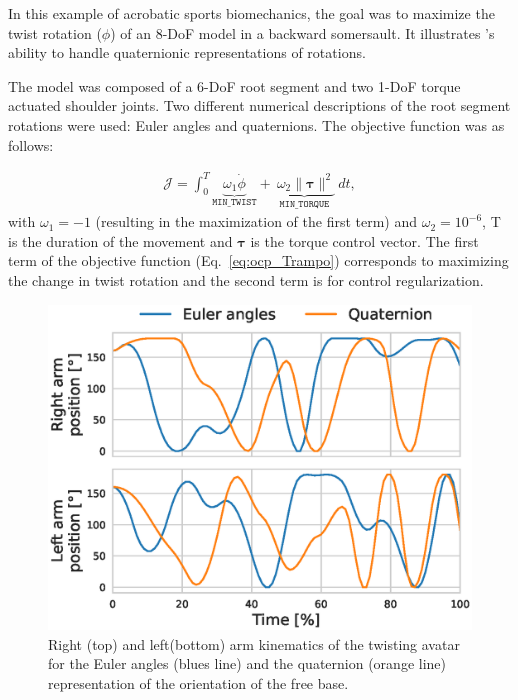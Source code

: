 In this example of acrobatic sports biomechanics, the goal was to maximize the twist rotation ($\phi$) of an 8-DoF model in a backward somersault. 
It illustrates \bioptim 's ability to handle quaternionic representations of rotations.

The model was composed of a 6-DoF root segment and two 1-DoF torque actuated shoulder joints.
Two different numerical descriptions of the root segment rotations were used: Euler angles and quaternions.
The objective function was as follows:

\begin{eqnarray}\label{eq:ocp_Trampo}
\mathcal{J} =  \int_0^T\underbrace{\omega_1 \dot{\phi}}_{\mathtt{MIN\_TWIST}}  + \underbrace{~\omega_2  \|\boldsymbol{\tau}\|^2}_{\mathtt{MIN\_ TORQUE}}~dt,
\end{eqnarray} 
with $\omega_1 = -1$ (resulting in the maximization of the first term) and $\omega_2 = 10^{-6}$, T is the duration of the movement and $\boldsymbol{\tau}$ is the torque control vector.
The first term of the objective function (Eq.~\ref{eq:ocp_Trampo}) corresponds to maximizing the change in twist rotation and the second term is for control regularization.
\begin{figure}[t!]
\centering
\includegraphics[width=\columnwidth]{figures/Twisting_armTech.eps}
\caption{Right (top) and left(bottom) arm kinematics of the twisting avatar for the Euler angles (blues line) and the quaternion (orange line) representation of the orientation of the free base.}
\label{fig:Twist_armTech_graphs}
\vspace*{-1.5cm}
\end{figure}

